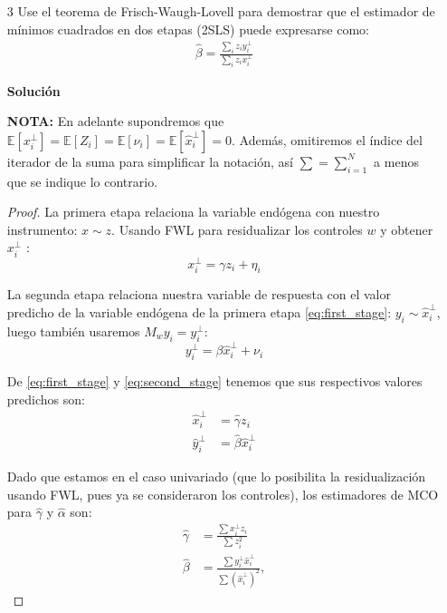 \documentclass[a4paper, answers, addpoints, 11pt]{exam}
\newenvironment{solucion}{%
  \begin{mdframed}[
    backgroundcolor=blue!5,    %
    linecolor=blue!50,          %
    linewidth=2pt,              %
    leftmargin=10pt,            %
    rightmargin=8pt,           %
    topline=true,              %
    bottomline=true,            %
    roundcorner=10pt,           %
    innerleftmargin=10pt,       %
    innerrightmargin=10pt,      %
    innerbottommargin=10pt,     %
    innertopmargin=10pt         %
  ]%
  \begin{tcolorbox}[colframe=blue!50!black, colback=blue!50, coltitle=white, sharp corners=all, boxrule=1mm, width=\textwidth, halign=left, valign=center, top=0mm, bottom=0mm, left=0mm, right=0mm] \textbf{Solución} \end{tcolorbox} }{\end{mdframed}}
\begin{document}
\begin{enumerate}
    \item[3] Use el teorema de Frisch-Waugh-Lovell para demostrar que el estimador de mínimos cuadrados en dos etapas (2SLS) puede expresarse como:
    \begin{align}
    \hat{\beta} = \frac{\sum_{i} z_i y^{\perp}_{i}}{\sum_{i} z_i x^{\perp}_{i}} \label{eq:beta_fwl_IV}
    \end{align}

    \begin{solucion}
    \textbf{NOTA:} En adelante supondremos que $\mathbb{E}[x_i^{\perp}] = \mathbb{E}[Z_i] = \mathbb{E}[\nu_i] = \mathbb{E}[\hat{x}_i^{\perp}] = 0$. Además, omitiremos el índice del iterador de la suma para simplificar la notación, así $\sum=\sum_{i=1}^N$ a menos que se indique lo contrario.
    \begin{proof}
        
    
    La primera etapa relaciona la variable endógena con nuestro instrumento: $x \sim z$. Usando FWL para residualizar los controles $w$ y obtener $x_i^\perp$ :
\begin{equation}
    x_i^{\perp} = \gamma z_i + \eta_i \label{eq:first_stage}
\end{equation}

La segunda etapa relaciona nuestra variable de respuesta con el valor predicho de la variable endógena de la primera etapa \ref{eq:first_stage}: $y_i \sim \hat{x}_i^\perp$, luego también usaremos $M_w y_i = y_i^{\perp}$:
\begin{equation}
    y_i^{\perp} = \beta \hat{x}_i^{\perp} + \nu_i \label{eq:second_stage}
\end{equation}

De \ref{eq:first_stage} y \ref{eq:second_stage} tenemos que sus respectivos valores predichos son:
\begin{align}
    \hat{x}_i^{\perp} &= \hat{\gamma} z_i \label{eq:fit_fs} \\
    \hat{y}_i^{\perp} &= \hat{\beta} \hat{x}_i^{\perp} \label{eq:fit_ss}
\end{align}

Dado que estamos en el caso univariado (que lo posibilita la residualización usando FWL, pues ya se consideraron los controles), los estimadores de MCO para $\hat{\gamma}$ y $\hat{\alpha}$ son:
\begin{align}
    \hat{\gamma} &= \frac{\sum x_i^{\perp} z_i}{\sum z_i^2} \label{eq:gamma_hat} \\
    \hat{\beta} &= \frac{\sum y_i^{\perp} \hat{x}_i^{\perp}}{\sum (\hat{x}_i^{\perp})^2} \label{eq:beta_hat},
\end{align}


\end{proof}
\end{solucion}
\end{enumerate}
\end{document}
